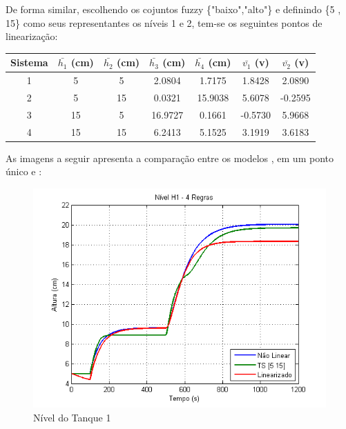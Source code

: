 De forma similar, escolhendo os cojuntos fuzzy \{"baixo","alto"\} e definindo \{5 , 15\} como seus representantes os níveis 1 e 2, tem-se os seguintes pontos de linearização:
\begin{center}
	\begin{tabular}{|c|c|c|c|c|c|c|}
		\hline
		Sistema & $\bar{h_1}$ (cm) & $\bar{h_2}$ (cm) & $\bar{h_3}$ (cm) & $\bar{h_4}$ (cm) & $\bar{v_1}$ (v) & $\bar{v_2}$ (v) \\ \hline
		1 & 5 & 5 & 2.0804 & 1.7175 & 1.8428 & 2.0890 \\ \hline
		2 & 5 & 15 & 0.0321 & 15.9038 & 5.6078 & -0.2595 \\ \hline
		3 & 15 & 5 & 16.9727 & 0.1661 & -0.5730 & 5.9668 \\ \hline
		4 & 15 & 15 & 6.2413 & 5.1525 & 3.1919 & 3.6183 \\	\hline
	\end{tabular}
\end{center}

As imagens a seguir apresenta a comparação entre os modelos ,  em um ponto único e :

\begin{figure}[H]
	\centering
	\includegraphics[width=\textwidth]{img/h1_ts2_nm.png}
	\caption{\small Nível do Tanque 1}
	\label{figH1TS2_nm}
\end{figure}


